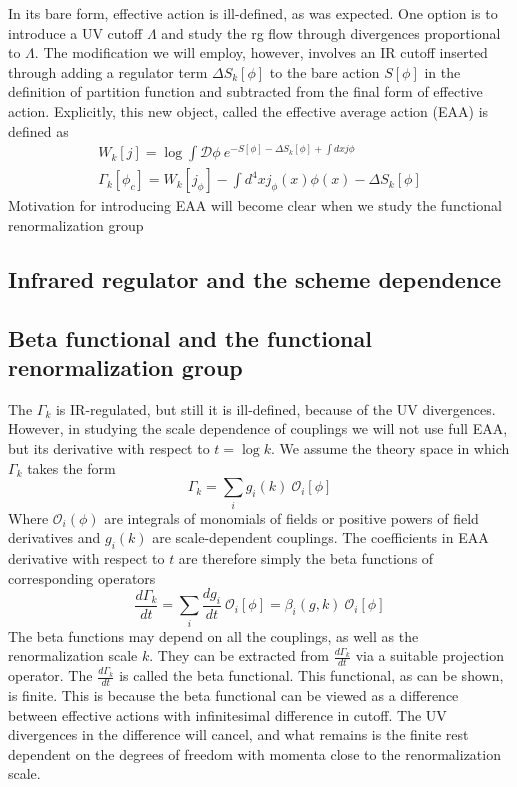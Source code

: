 \documentclass[11pt, a4paper]{article}
\begin{document}
In its bare form, effective action is ill-defined, as was expected. One option is to introduce a UV cutoff $\Lambda$
and study the rg flow through divergences proportional to $\Lambda$. The modification we will employ, however, involves
an IR cutoff inserted through adding a regulator term $\Delta S_k[\phi]$ to the bare action $S[\phi]$ in the definition of partition function
and subtracted from the final form of effective action. Explicitly, this new object, called the effective average action (EAA) is defined as
\begin{eqnarray}
    W_k[j] = \log{\int \mathcal{D}\phi \ e^{-S[\phi] - \Delta S_k[\phi] + \int dx j \phi}}\\
    \Gamma_k[\phi_c] = W_k[j_\phi] - \int d^4 x j_\phi(x) \phi(x) - \Delta S_k[\phi]
\end{eqnarray}
Motivation for introducing EAA will become clear when we study the functional renormalization group

\subsection*{\centering Infrared regulator and the scheme dependence}

\subsection*{\centering Beta functional and the functional renormalization group}

The $\Gamma_k$ is IR-regulated, but still it is ill-defined, because of the UV divergences. 
However, in studying the scale dependence of couplings we will not use full EAA, 
but its derivative with respect to $t = \log{k}$.
We assume the theory space in which $\Gamma_k$ takes the form
\begin{equation}
    \Gamma_k = \sum_i g_i(k) \ \mathcal{O}_i [\phi]
\end{equation}
Where $\mathcal{O}_i (\phi)$ are integrals of monomials of fields or positive powers of field derivatives 
and $g_i(k)$ are scale-dependent couplings.
The coefficients in EAA derivative with respect to $t$ are therefore simply the beta functions of corresponding operators
\begin{equation}
    \frac{d \Gamma_k}{dt} = \sum_i \frac{d g_i}{dt} \ \mathcal{O}_i [\phi] = \beta_i(g,k) \ \mathcal{O}_i [\phi]
\end{equation}
The beta functions may depend on all the couplings, as well as the renormalization scale $k$.
They can be extracted from $\frac{d \Gamma_k}{dt}$ via a suitable projection operator. 
The $\frac{d \Gamma_k}{dt}$ is called the beta functional. This functional, as can be shown, is finite.
This is because the beta functional can be viewed as a difference between effective actions with infinitesimal
difference in cutoff. The UV divergences in the difference will cancel, and what remains is the finite rest
dependent on the degrees of freedom with momenta close to the renormalization scale.
\end{document}
